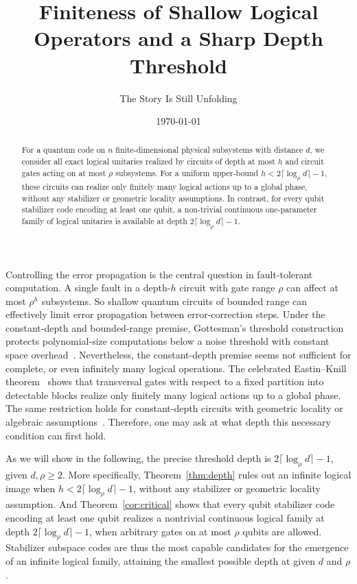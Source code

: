 \documentclass[aps,prl,reprint,notitlepage,nofootinbib,nobibnotes]{revtex4-2}
\begin{document}
\raggedbottom
\title{Finiteness of Shallow Logical Operators and a Sharp Depth Threshold}
\author{The Story Is Still Unfolding}
\date{\today}

\begin{abstract}
For a quantum code on $n$ finite-dimensional physical subsystems with distance $d$, we
consider all exact logical unitaries realized by circuits of depth at most $h$ and circuit
gates acting on at most $\rho$ subsystems. For a uniform upper-bound $h<2\lceil\log_{\rho} d\rceil-1$, these circuits can realize only finitely many logical actions up to a global
phase, without any stabilizer or geometric locality assumptions. In contrast, for every qubit stabilizer code encoding at least one qubit, a non-trivial continuous one-parameter family of logical unitaries is available at depth
$2\lceil\log_{\rho} d\rceil-1$.
\end{abstract}
\maketitle

Controlling the error propagation is the central question in
fault-tolerant computation. A single fault in a
depth-\(h\) circuit with gate range \(\rho\) can affect at most \(\rho^h\) subsystems. So shallow quantum
circuits of bounded range can effectively limit error propagation between
error-correction steps.  Under the constant-depth and bounded-range premise,
Gottesman's threshold construction protects polynomial-size
computations below a noise threshold with constant space
overhead~\cite{Gottesman}. Nevertheless, the constant-depth premise seems not sufficient for complete, or even infinitely many logical operations.
The celebrated Eastin--Knill theorem~\cite{EK} shows that transversal gates with respect to a fixed partition into detectable blocks realize only finitely many logical actions up to a global phase. The same restriction holds for constant-depth circuits with geometric locality or algebraic assumptions~\cite{BK,PY,JKY,Webster}.
Therefore, one may ask at what depth this necessary condition can first hold.


As we will show in the following, the precise threshold depth is \(2\lceil\log_{\rho} d\rceil-1\), given $d, \rho\geq 2$.
More specifically, Theorem~\ref{thm:depth} rules out an infinite logical image when
\(h<2\lceil\log_{\rho} d\rceil-1\), without any stabilizer or geometric locality
assumption. And Theorem~\ref{cor:critical} shows that every qubit stabilizer
code encoding at least one qubit realizes a nontrivial
continuous logical family at depth \(2\lceil\log_{\rho} d\rceil-1\), when
arbitrary gates on at most \(\rho\) qubits are allowed. Stabilizer subspace
codes are thus the most capable candidates for the emergence of an infinite
logical family, attaining the smallest possible depth at given \(d\)
and \(\rho\).
\end{document}
